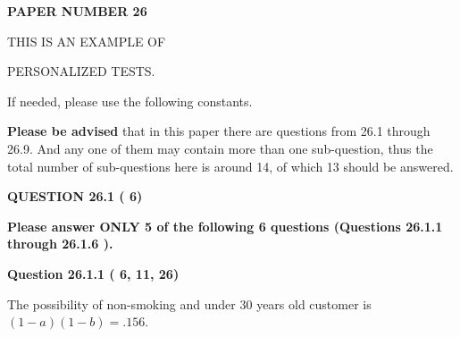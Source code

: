 \documentclass[12pt]{article}
\begin{document}
 
 
   
   
\newpage 
\setcounter{page}{ 
    26001 } 
   
   
   
   
 {\textbf{ \Large{ PAPER NUMBER          26 }}}
   
   
\vspace{0.2in}
   
   
   
   
   
   
 \vspace{0.2in}
 
 
{\Huge  THIS IS AN EXAMPLE OF}
 
{\Huge  PERSONALIZED TESTS. }
 
If needed, please use the following constants.
 
 
 
{\textbf{\large{Please be advised}}} that in this paper there are questions from
26.1 through
26.9.
And any one of them may contain more than one sub-question, thus the total number
of sub-questions here is around 14, of which
13 should be answered.
 
\vspace{0.3in}
 
 
   
   
  
\vspace{0.2in}
  
{\textbf{\Large{QUESTION
26.1 
 (          6)
}}}
  
  
{\textbf{\Large{Please answer ONLY  %
           5 %
 of the following  %
           6 %
 questions (Questions  %
26.1.1 %
 through  %
26.1.6 %
 ). }}}
   
   
  
\vspace{0.2in}
  
{\textbf{\Large{Question
26.1.1 
 (          6,         11,         26)
}}}
  
  
 
 
\noindent{}

The possibility of  %
 non-smoking and  %
under 30 years old
customer is $ (1-a)(1-b) =  %
.156 $.
 
 
  
\vspace{0.2in}
  
\end{document}
